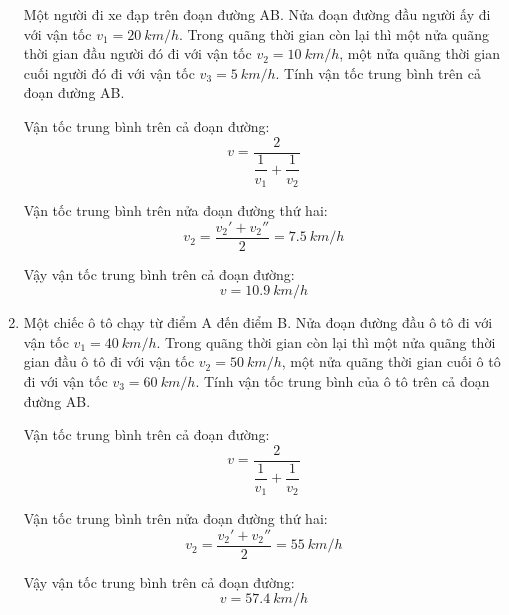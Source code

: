 \begin{enumerate}[label=\bfseries Câu \arabic*:]
	\cauhoi
	{Một người đi xe đạp trên đoạn đường AB. Nửa đoạn đường đầu người ấy đi với vận tốc $v_1=\SI{20}{km/h}$. Trong quãng thời gian còn lại thì một nửa quãng thời gian đầu người đó đi với vận tốc $v_2=\SI{10}{km/h}$, một nửa quãng thời gian cuối người đó đi với vận tốc $v_3=\SI{5}{km/h}$. Tính vận tốc trung bình trên cả đoạn đường AB. 
	}
	
	\loigiai
	{
	Vận tốc trung bình trên cả đoạn đường:
	$$v=\dfrac{2}{\dfrac{1}{v_1}+\dfrac{1}{v_2}}$$
	
	Vận tốc trung bình trên nửa đoạn đường thứ hai:
	$$v_2=\dfrac{v_2'+v_2''}{2} = \SI{7.5}{km/h}$$
	
	Vậy vận tốc trung bình trên cả đoạn đường:
	$$v=\SI{10.9}{km/h}$$
	}
	\item {}
	
	\cauhoi
	{Một chiếc ô tô chạy từ điểm A đến điểm B. Nửa đoạn đường đầu ô tô đi với vận tốc $v_1=\SI{40}{km/h}$. Trong quãng thời gian còn lại thì một nửa quãng thời gian đầu ô tô đi với vận tốc $v_2=\SI{50}{km/h}$, một nửa quãng thời gian cuối ô tô đi với vận tốc $v_3=\SI{60}{km/h}$. Tính vận tốc trung bình của ô tô trên cả đoạn đường AB.
	}
	
	\loigiai
	{	Vận tốc trung bình trên cả đoạn đường:
		$$v=\dfrac{2}{\dfrac{1}{v_1}+\dfrac{1}{v_2}}$$
		
		Vận tốc trung bình trên nửa đoạn đường thứ hai:
		$$v_2=\dfrac{v_2'+v_2''}{2} = \SI{55}{km/h}$$
		
		Vậy vận tốc trung bình trên cả đoạn đường:
		$$v=\SI{57.4}{km/h}$$
	}
\end{enumerate}